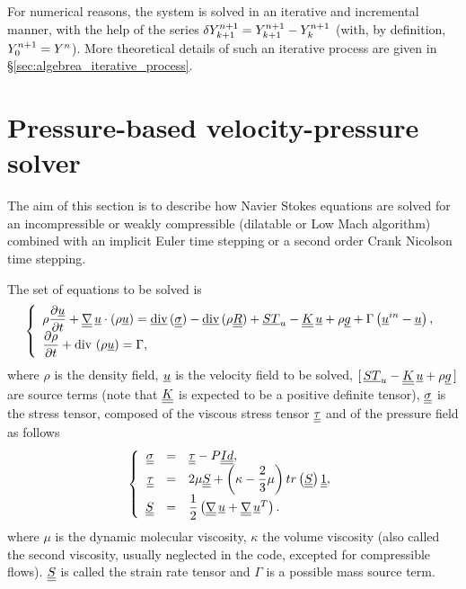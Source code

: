 For numerical reasons, the system is solved in an iterative and incremental
manner, with the help of the series $\delta Y^{n+1}_{k+1}=Y^{n+1}_{k+1}-Y^{n+1}_{k}$
(with, by definition, $Y^{n+1}_0=Y^{n}$).
More theoretical details of such an iterative process are given in \S \ref{sec:algebrea_iterative_process}.

\section{Pressure-based velocity-pressure solver}
The aim of this section is to describe how Navier Stokes equations are solved for an incompressible
or weakly compressible (dilatable or Low Mach algorithm) combined with an
implicit Euler time stepping or a second order Crank Nicolson time stepping.

The set of equations to be solved is
\begin{equation}\label{eq:timstp:navier_stokes}
\left\{\begin{array}{l}
\displaystyle \rho \dfrac{\partial \underline{u}}{\partial t} + \underline{\underline{{\nabla}}} \, \underline{u} \cdot \left( \rho\underline{u}  \right)
=\underline{\text{div}}\,(\underline{\underline{\sigma}}) - \underline{\text{div}}\,(\rho \underline{\underline{R}}) + \underline{ST}_u - \underline{\underline{K}}\,\underline{u} + \rho \underline{g} + \Gamma \left( \underline{u}^{in} - \underline{u} \right), \\
\dfrac{\partial \rho}{\partial t} + \text{div}\,\left( \rho \underline{u} \right) = \Gamma ,
\end{array}\right.
\end{equation}
%
where $\rho$ is the density field, $\underline{u}$ is the velocity field to be solved,
$[\,\underline{ST}_u-\underline{\underline{K}}\,\underline{u} + \rho \underline{g} \,]$  are source terms (note that $\underline{\underline{K}}$ is expected to be a positive definite tensor),
 $\underline{\underline{\sigma}}$ is the stress tensor, composed of the viscous stress tensor $\underline{\underline{\tau}}$ and of the pressure field as follows
\begin{equation}
\left\{\begin{array}{r c l}
\tens{\sigma} &=& \tens{\tau} - P\tens{Id} , \\%
\tens{\tau} & =& 2 \mu  \tens{S} +   \left( \kappa - \dfrac{2}{3}\mu \right)   \trace \left( \tens{S} \right) \tens{1} ,\\
\tens{S} &=& \dfrac{1}{2} \left( \gradt \, \vect{u}+\transpose{\gradt \, \vect{u}} \right) .
\end{array}\right.
\end{equation}
 where  $\mu$ is the dynamic molecular viscosity,
 $\kappa$ the volume viscosity (also called the second viscosity, usually neglected in the code, excepted for compressible flows).
$\underline{\underline{S}}$ is called the strain rate tensor and  $\Gamma$ is a possible mass source term.

